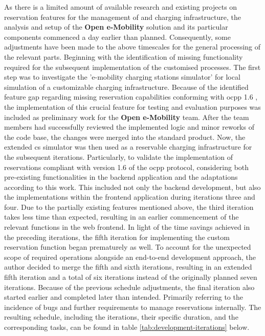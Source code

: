 As there is a limited amount of available research and existing projects on reservation features for the management of  and charging infrastructure, the analysis and setup of the \textbf{Open e-Mobility} \cite{noauthor_github_nodate,noauthor_github_nodate-1,noauthor_github_nodate-2,noauthor_github_nodate-3} solution and its particular components commenced a day earlier than planned.
Consequently, some adjustments have been made to the above timescales for the general processing of the relevant parts.
Beginning with the identification of missing functionality required for the subsequent implementation of the customised processes.
The first step was to investigate the 'e-mobility charging stations simulator' \cite{noauthor_github_nodate-3} for local simulation of a customizable charging infrastructure.
Because of the identified feature gap regarding missing reservation capabilities conforming with \acrshort{ocpp} 1.6 \cite{noauthor_ocpp_nodate}, the implementation of this crucial feature for testing and evaluation purposes was included as preliminary work for the \textbf{Open e-Mobility} team.
After the team members had successfully reviewed the implemented logic and minor reworks of the code base, the changes were merged into the standard product.
Now, the extended \acrshort{cs} simulator was then used as a reservable charging infrastructure for the subsequent iterations.
Particularly, to validate the implementation of reservations compliant with version 1.6 of the \acrshort{ocpp} protocol, considering both pre-existing functionalities in the backend application and the adaptations according to this work.
This included not only the backend development, but also the implementations within the frontend application during iterations three and four.
Due to the partially existing features mentioned above, the third iteration takes less time than expected, resulting in an earlier commencement of the relevant functions in the web frontend.
In light of the time savings achieved in the preceding iterations, the fifth iteration for implementing the custom reservation function began prematurely as well. 
To account for the unexpected scope of required operations alongside an end-to-end development approach, the author decided to merge the fifth and sixth iterations, resulting in an extended fifth iteration and a total of six iterations instead of the originally planned seven iterations.
Because of the previous schedule adjustments, the final iteration also started earlier and completed later than intended. 
Primarily referring to the incidence of bugs and further requirements to manage reservations internally.
The resulting schedule, including the iterations, their specific duration, and the corresponding tasks, can be found in table \ref{tab:development-iterations} below.

